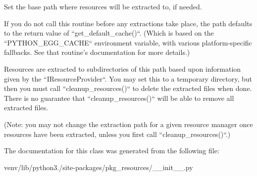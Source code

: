 \begin{DoxyVerb}Set the base path where resources will be extracted to, if needed.

If you do not call this routine before any extractions take place, the
path defaults to the return value of ``get_default_cache()``.  (Which
is based on the ``PYTHON_EGG_CACHE`` environment variable, with various
platform-specific fallbacks.  See that routine's documentation for more
details.)

Resources are extracted to subdirectories of this path based upon
information given by the ``IResourceProvider``.  You may set this to a
temporary directory, but then you must call ``cleanup_resources()`` to
delete the extracted files when done.  There is no guarantee that
``cleanup_resources()`` will be able to remove all extracted files.

(Note: you may not change the extraction path for a given resource
manager once resources have been extracted, unless you first call
``cleanup_resources()``.)
\end{DoxyVerb}
 

The documentation for this class was generated from the following file\+:\begin{DoxyCompactItemize}
\item 
venv/lib/python3./site-\/packages/pkg\+\_\+resources/\+\_\+\+\_\+init\+\_\+\+\_\+.\+py\end{DoxyCompactItemize}
